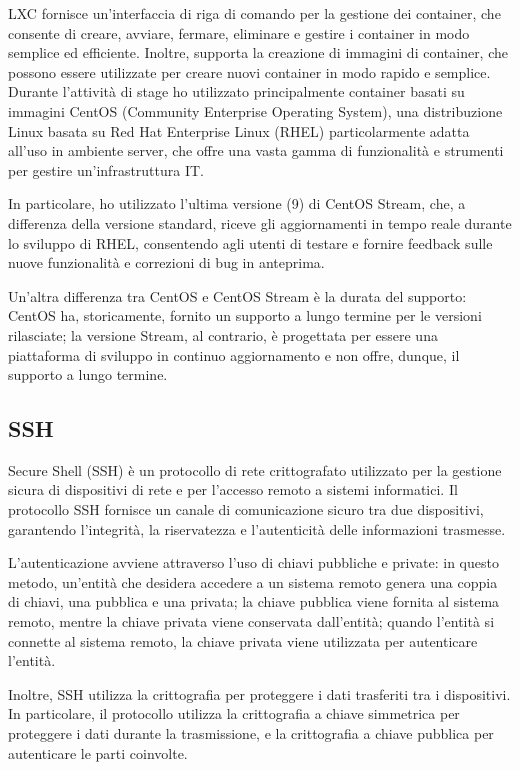 LXC fornisce un'interfaccia di riga di comando per la gestione dei container, che consente di creare, avviare, fermare, eliminare e gestire i container in modo semplice ed efficiente. Inoltre, supporta la creazione di immagini di container, che possono essere utilizzate per creare nuovi container in modo rapido e semplice.
\\
Durante l'attività di stage ho utilizzato principalmente container basati su immagini CentOS (Community Enterprise Operating System), una distribuzione Linux basata su Red Hat Enterprise Linux (RHEL) particolarmente adatta all'uso in ambiente server, che offre una vasta gamma di funzionalità e strumenti per gestire un'infrastruttura IT. 

In particolare, ho utilizzato l'ultima versione (9) di CentOS Stream, che, a differenza della versione standard, riceve gli aggiornamenti in tempo reale durante lo sviluppo di RHEL, consentendo agli utenti di testare e fornire feedback sulle nuove funzionalità e correzioni di bug in anteprima.

Un'altra differenza tra CentOS e CentOS Stream è la durata del supporto: CentOS ha, storicamente, fornito un supporto a lungo termine per le versioni rilasciate; la versione Stream, al contrario, è progettata per essere una piattaforma di sviluppo in continuo aggiornamento e non offre, dunque, il supporto a lungo termine.

\subsection{SSH}
Secure Shell (SSH) è un protocollo di rete crittografato utilizzato per la gestione sicura di dispositivi di rete e per l'accesso remoto a sistemi informatici. Il protocollo SSH fornisce un canale di comunicazione sicuro tra due dispositivi, garantendo l'integrità, la riservatezza e l'autenticità delle informazioni trasmesse.

L'autenticazione avviene attraverso l'uso di chiavi pubbliche e private: in questo metodo, un'entità che desidera accedere a un sistema remoto genera una coppia di chiavi, una pubblica e una privata; la chiave pubblica viene fornita al sistema remoto, mentre la chiave privata viene conservata dall'entità; quando l'entità si connette al sistema remoto, la chiave privata viene utilizzata per autenticare l'entità.

Inoltre, SSH utilizza la crittografia per proteggere i dati trasferiti tra i dispositivi. In particolare, il protocollo utilizza la crittografia a chiave simmetrica per proteggere i dati durante la trasmissione, e la crittografia a chiave pubblica per autenticare le parti coinvolte.

